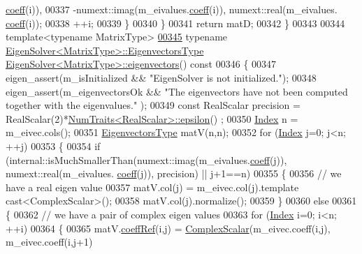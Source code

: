 \begin{DoxyCode}
      \hyperlink{class_eigen_1_1_plain_object_base_afbfc12954f16d21aedb7bd839f64a278}{coeff}(i)),
00337                                        -numext::imag(m\_eivalues.\hyperlink{class_eigen_1_1_plain_object_base_afbfc12954f16d21aedb7bd839f64a278}{coeff}(i)), numext::real(m\_eivalues.
      \hyperlink{class_eigen_1_1_plain_object_base_afbfc12954f16d21aedb7bd839f64a278}{coeff}(i));
00338       ++i;
00339     \}
00340   \}
00341   \textcolor{keywordflow}{return} matD;
00342 \}
00343 
00344 \textcolor{keyword}{template}<\textcolor{keyword}{typename} MatrixType>
\hyperlink{group___eigenvalues___module_a66288022802172e3ee059283b26201d7}{00345} \textcolor{keyword}{typename} \hyperlink{group___core___module}{EigenSolver<MatrixType>::EigenvectorsType} 
      \hyperlink{group___eigenvalues___module_a66288022802172e3ee059283b26201d7}{EigenSolver<MatrixType>::eigenvectors}()\textcolor{keyword}{ const}
00346 \textcolor{keyword}{}\{
00347   eigen\_assert(m\_isInitialized && \textcolor{stringliteral}{"EigenSolver is not initialized."});
00348   eigen\_assert(m\_eigenvectorsOk && \textcolor{stringliteral}{"The eigenvectors have not been computed together with the eigenvalues."}
      );
00349   \textcolor{keyword}{const} RealScalar precision = RealScalar(2)*\hyperlink{group___core___module_struct_eigen_1_1_num_traits}{NumTraits<RealScalar>::epsilon}()
      ;
00350   \hyperlink{group___eigenvalues___module_a5bff6a6bc0efac67d52c60c2c3deb9ee}{Index} n = m\_eivec.cols();
00351   \hyperlink{group___core___module}{EigenvectorsType} matV(n,n);
00352   \textcolor{keywordflow}{for} (\hyperlink{group___eigenvalues___module_a5bff6a6bc0efac67d52c60c2c3deb9ee}{Index} j=0; j<n; ++j)
00353   \{
00354     \textcolor{keywordflow}{if} (internal::isMuchSmallerThan(numext::imag(m\_eivalues.\hyperlink{class_eigen_1_1_plain_object_base_afbfc12954f16d21aedb7bd839f64a278}{coeff}(j)), numext::real(m\_eivalues.
      \hyperlink{class_eigen_1_1_plain_object_base_afbfc12954f16d21aedb7bd839f64a278}{coeff}(j)), precision) || j+1==n)
00355     \{
00356       \textcolor{comment}{// we have a real eigen value}
00357       matV.col(j) = m\_eivec.col(j).template cast<ComplexScalar>();
00358       matV.col(j).normalize();
00359     \}
00360     \textcolor{keywordflow}{else}
00361     \{
00362       \textcolor{comment}{// we have a pair of complex eigen values}
00363       \textcolor{keywordflow}{for} (\hyperlink{group___eigenvalues___module_a5bff6a6bc0efac67d52c60c2c3deb9ee}{Index} i=0; i<n; ++i)
00364       \{
00365         matV.\hyperlink{class_eigen_1_1_plain_object_base_a25626a55b26a4323565f79d1b7c48ea8}{coeffRef}(i,j)   = \hyperlink{group___eigenvalues___module_a4d0b2a773357d0a6ec98e026f04002ed}{ComplexScalar}(m\_eivec.coeff(i,j),  m\_eivec.coeff(i,j+1)

\end{DoxyCode}
